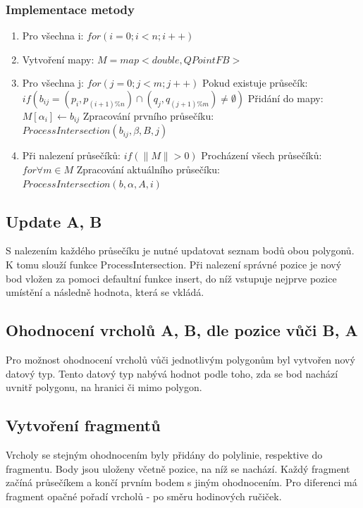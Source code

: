 \documentclass[a4paper, 12pt]{article}
\begin{document}
\subsubsection{Implementace metody}
\begin{enumerate}
\item Pro všechna i: $for (i = 0; i < n; i++)$
\item Vytvoření mapy: $ M = map<double, QPointFB>$
\item Pro všechna j: $for (j = 0; j < m; j++)$
\subitem Pokud existuje průsečík: $if (b_{ij} = (p_i, p_{(i+1)\%n}) \cap (q_j, q_{(j+1)\%m})  \neq \emptyset  )$
\subitem Přidání do mapy: $M[\alpha_i] \leftarrow b_{ij}$
\subitem Zpracování prvního průsečíku: $ProcessIntersection (b_{ij}, \beta, B, j)$
\item Při nalezení průsečíků: $if (\| M \| > 0) $
\subitem Procházení všech průsečíků: $for \forall m \in M$
\subitem Zpracování aktuálního průsečíku: $ProcessIntersection(b, \alpha, A, i)$

\end{enumerate}


\subsection{Update A, B}
S nalezením každého průsečíku je nutné updatovat seznam bodů obou polygonů. K tomu slouží funkce ProcessIntersection. Při nalezení správné pozice je nový bod vložen za pomoci defaultní funkce insert, do níž vstupuje nejprve pozice umístění a následně hodnota, která se vkládá.

\subsection{Ohodnocení vrcholů A, B, dle pozice vůči B, A}
Pro možnost ohodnocení vrcholů vůči jednotlivým polygonům byl vytvořen nový datový typ. Tento datový typ nabývá hodnot podle toho, zda se bod nachází uvnitř polygonu, na hranici či mimo polygon. 


\subsection{Vytvoření fragmentů}
Vrcholy se stejným ohodnocením byly přidány do polylinie, respektive do fragmentu. Body jsou uloženy včetně pozice, na níž se nachází. Každý fragment začíná průsečíkem a končí prvním bodem s jiným ohodnocením. Pro diferenci má fragment opačné pořadí vrcholů - po směru hodinových ručiček. 
\end{document}
